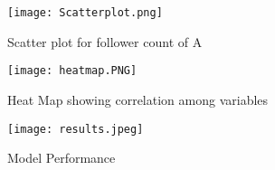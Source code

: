 \documentclass[sigconf]{acmart}
\begin{document}
\begin{figure}[htp]
    \texttt{[image: Scatterplot.png]}
    \caption{Scatter plot for follower count of A }
    \label{fig:figure 3}
\end{figure}

\begin{figure}[htp]
    \texttt{[image: heatmap.PNG]}
    \caption{Heat Map showing correlation among variables}
    \label{fig:figure4}
\end{figure}



\begin{figure}[htp]
    \texttt{[image: results.jpeg]}
    \caption{Model Performance}
    \label{fig:figure 5}
\end{figure}
\end{document}
